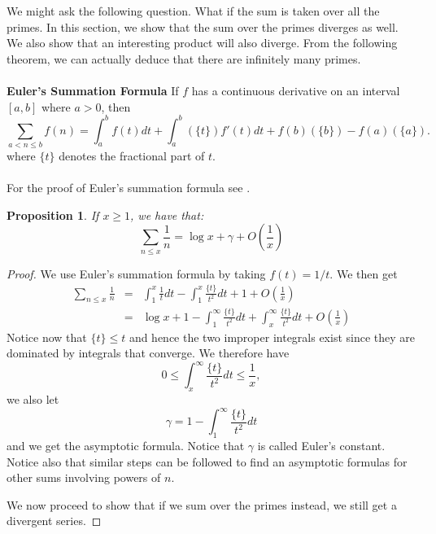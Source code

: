\documentclass[12pt,letterpaper]{book}
\newtheorem{prop}{Proposition}
\begin{document}
\par We might ask the following question. What if the sum is taken
over all the primes. In this section, we show that the sum over the
primes diverges as well. We also show that an interesting product
will also diverge. From the following theorem, we can actually
deduce that there are infinitely many primes.\\
\\
 \textbf{Euler's Summation Formula}
If $f$ has a continuous derivative on an interval $[a,b]$ where $a>
0$, then
\begin{equation*}
\sum_{a<n\leq
b}f(n)=\int_{a}^bf(t)dt+\int_{a}^b(\{t\})f'(t)dt+f(b)(\{b\})-f(a)(\{a\}).
\end{equation*}
where $\{t\}$ denotes the fractional part of $t$.\\
\\ For the proof of Euler's summation formula see \cite[Chapter
3]{Apostol}.
\begin{prop}
If $x\geq 1$, we have that:
\begin{equation*}
\sum_{n\leq x}\frac{1}{n}=\log x+\gamma+O\left(\frac{1}{x}\right)
\end{equation*}
\end{prop}
\begin{proof}
We use Euler's summation formula by taking $f(t)=1/t$.  We then get
\begin{eqnarray*}
\sum_{n\leq
x}\frac{1}{n}&=&\int_{1}^x\frac{1}{t}dt-\int_1^x\frac{\{t\}}{t^2}dt+1+O\left(\frac{1}{x}\right)\\
&=& \log
x+1-\int_1^{\infty}\frac{\{t\}}{t^2}dt+\int_x^{\infty}\frac{\{t\}}{t^2}dt+O\left(\frac{1}{x}\right)
\end{eqnarray*}
Notice now that $\{t\}\leq t$ and hence the two improper integrals
exist since they are dominated by integrals that converge. We
therefore have
\begin{equation*}
0\leq \int_x^\infty\frac{\{t\}}{t^2}dt\leq \frac{1}{x},
\end{equation*}
we also let 
\begin{equation*}
\gamma=1-\int_1^{\infty}\frac{\{t\}}{t^2}dt
\end{equation*}
and we get the asymptotic formula.  Notice that $\gamma$ is called
Euler's constant.  Notice also that similar
steps can be followed to find an asymptotic formulas for other sums
involving powers of $n$.
\par We now proceed to show that if we sum over the primes instead,
we still get a divergent series.
\end{proof}
\end{document}
